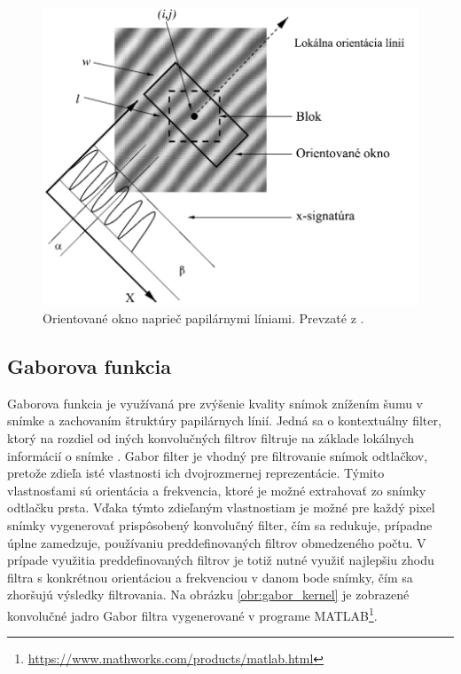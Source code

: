   \begin{figure}[h]
    \centering
    \includegraphics[width=0.7\linewidth]{obrazky-figures/frekvencia-Hong.png} %
    \caption{Orientované okno naprieč papilárnymi líniami. Prevzaté z \cite{Hong}.}
    \label{obr:frekvencia-Hong}
  \end{figure}

  \subsection{Gaborova funkcia}
  Gaborova funkcia je využívaná pre zvýšenie kvality snímok znížením šumu v snímke a zachovaním štruktúry papilárnych línií. Jedná sa o kontextuálny
  filter, ktorý na rozdiel od iných konvolučných filtrov filtruje na základe lokálnych informácií o snímke \cite{Handbook}. Gabor filter je vhodný
  pre filtrovanie snímok odtlačkov, pretože zdieľa isté vlastnosti ich dvojrozmernej reprezentácie. Týmito vlastnosťami sú orientácia a frekvencia,
  ktoré je možné extrahovať zo snímky odtlačku prsta. Vďaka týmto zdieľaným vlastnostiam je možné pre každý pixel snímky vygenerovať prispôsobený konvolučný
  filter, čím sa redukuje, prípadne úplne zamedzuje, používaniu preddefinovaných filtrov obmedzeného počtu. V prípade využitia preddefinovaných filtrov je totiž
  nutné využiť najlepšiu zhodu filtra s konkrétnou orientáciou a frekvenciou v danom bode snímky, čím sa zhoršujú výsledky filtrovania.
  Na obrázku \ref{obr:gabor_kernel} je zobrazené konvolučné jadro Gabor filtra vygenerované v programe
  MATLAB\footnote{\href{https://www.mathworks.com/products/matlab.html}{https://www.mathworks.com/products/matlab.html}}.
  
